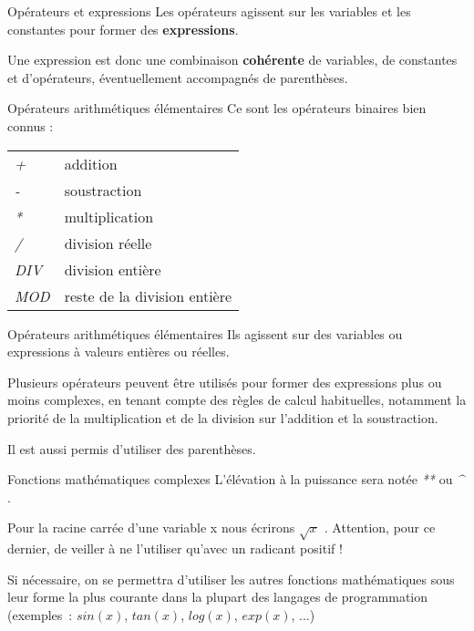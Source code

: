 \begin{frame}{Opérateurs et expressions}
	Les opérateurs agissent sur les variables et les constantes pour former
	des \textbf{expressions}. 
	
	Une expression est donc une combinaison
	\textbf{cohérente} de variables, de constantes et d’opérateurs,
	éventuellement accompagnés de parenthèses.
\end{frame}

\begin{frame}{Opérateurs arithmétiques élémentaires}
	Ce sont les opérateurs binaires bien connus :
	\begin{tabular}{p{1.6cm}|p{11.5cm}}
	\raggedleft  \textit{+} & addition\\
	\raggedleft  \textit{-} & soustraction\\
	\raggedleft  \textit{*} & multiplication\\
	\raggedleft  \textit{/} & division réelle\\
	\raggedleft  \textit{DIV} & division entière\\
	\raggedleft  \textit{MOD} & reste de la division entière\\		
	\end{tabular}
\end{frame}

\begin{frame}{Opérateurs arithmétiques élémentaires}
	Ils agissent sur des variables ou expressions à valeurs entières ou
	réelles. 
	
	Plusieurs opérateurs peuvent être utilisés pour former des
	expressions plus ou moins complexes, en tenant compte des règles de
	calcul habituelles, notamment la priorité de la multiplication et de la
	division sur l’addition et la soustraction. 
	
	Il est aussi permis	d’utiliser des parenthèses.
\end{frame}

\begin{frame}{Fonctions mathématiques complexes}
	L’élévation à la puissance sera notée \textit{**} ou
	\textit{\^{}} . 
	
	\bigskip
	
	Pour la racine carrée d’une variable x nous
	écrirons  $\sqrt{x}$ \textit{.} Attention, pour ce dernier, de veiller
	à ne l’utiliser qu’avec un radicant positif !

	\bigskip

	Si nécessaire, on se permettra d'utiliser les autres
	fonctions mathématiques sous leur forme la plus courante dans la
	plupart des langages de programmation (exemples~:
	$sin(x)$, $tan(x)$, $log(x)$, $exp(x)$, ...)
\end{frame}

